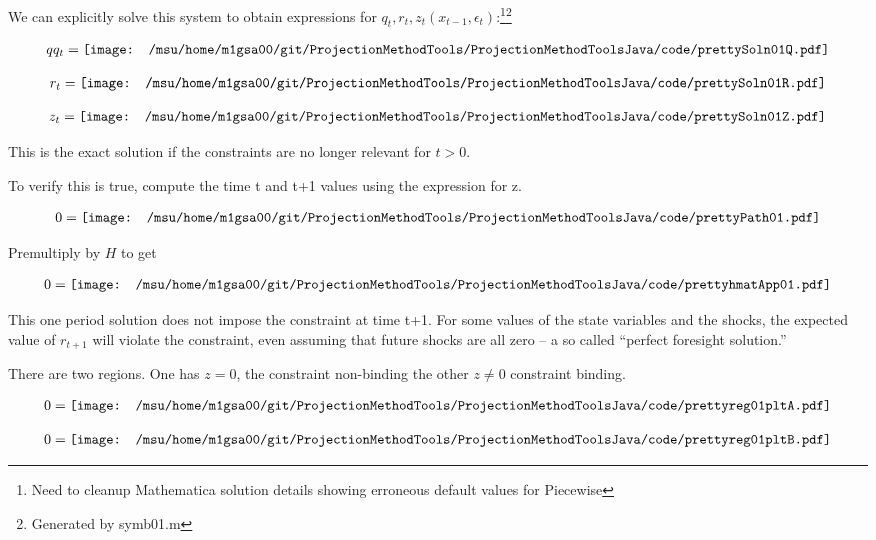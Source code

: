 We can explicitly solve this system to obtain  expressions for $q_t, r_t, z_{t}(x_{t-1},\epsilon_t) $:\footnote{Need to cleanup Mathematica solution details showing erroneous default values for Piecewise}\footnote{Generated by symb01.m}

\begin{gather*}
  qq_t=\vcenter{\hbox{\texttt{[image: /msu/home/m1gsa00/git/ProjectionMethodTools/ProjectionMethodToolsJava/code/prettySoln01Q.pdf]}}}
\end{gather*}

\begin{gather*}
  r_t=\vcenter{\hbox{\texttt{[image: /msu/home/m1gsa00/git/ProjectionMethodTools/ProjectionMethodToolsJava/code/prettySoln01R.pdf]}}}
\end{gather*}

\begin{gather*}
  z_t=\vcenter{\hbox{\texttt{[image: /msu/home/m1gsa00/git/ProjectionMethodTools/ProjectionMethodToolsJava/code/prettySoln01Z.pdf]}}}
\end{gather*}

This is the exact solution if the constraints are no longer relevant for 
$t >0$.

To verify this is true, compute the time t and t+1 values using the expression for z.

\begin{gather*}
  0=\vcenter{\hbox{\texttt{[image: /msu/home/m1gsa00/git/ProjectionMethodTools/ProjectionMethodToolsJava/code/prettyPath01.pdf]}}}
\end{gather*}

Premultiply by $H$ to get

\begin{gather*}
  0=\vcenter{\hbox{\texttt{[image: /msu/home/m1gsa00/git/ProjectionMethodTools/ProjectionMethodToolsJava/code/prettyhmatApp01.pdf]}}}
\end{gather*}


This one period solution does not impose the constraint at time t+1.  For some values of the state variables and the shocks, the expected value 
of $r_{t+1}$ will violate the constraint, even assuming that future shocks are all zero -- a so called ``perfect foresight solution.''


There are two regions.  One has $z=0$, the constraint non-binding the other 
$z\ne 0$ constraint binding.


\begin{gather*}
  0=\vcenter{\hbox{\texttt{[image: /msu/home/m1gsa00/git/ProjectionMethodTools/ProjectionMethodToolsJava/code/prettyreg01pltA.pdf]}}}
\end{gather*}


\begin{gather*}
  0=\vcenter{\hbox{\texttt{[image: /msu/home/m1gsa00/git/ProjectionMethodTools/ProjectionMethodToolsJava/code/prettyreg01pltB.pdf]}}}
\end{gather*}


